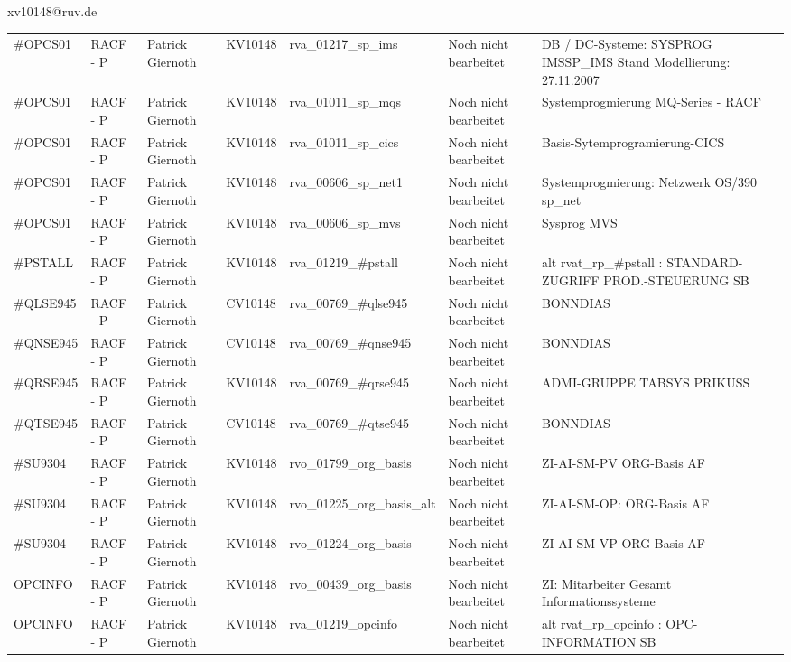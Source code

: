 \documentclass[a4paper,landscape,12pt]{letter}
\begin{document}
\begin{letter}{xv10148@ruv.de\hfill \break}
\begin{tiny}
\begin{longtable}{|p{35mm}|p{15mm}|p{25mm}|p{10mm}|p{40mm}|p{50mm}|p{50mm}|}
\#OPCS01 & RACF - P & Patrick Giernoth & KV10148 & rva\_01217\_sp\_ims & Noch nicht bearbeitet & DB / DC-Systeme:  SYSPROG IMSSP\_IMS Stand Modellierung: 27.11.2007 \\
\#OPCS01 & RACF - P & Patrick Giernoth & KV10148 & rva\_01011\_sp\_mqs & Noch nicht bearbeitet & Systemprogmierung MQ-Series - RACF \\
\#OPCS01 & RACF - P & Patrick Giernoth & KV10148 & rva\_01011\_sp\_cics & Noch nicht bearbeitet & Basis-Sytemprogramierung-CICS \\
\#OPCS01 & RACF - P & Patrick Giernoth & KV10148 & rva\_00606\_sp\_net1 & Noch nicht bearbeitet & Systemprogmierung: Netzwerk OS/390 sp\_net \\
\#OPCS01 & RACF - P & Patrick Giernoth & KV10148 & rva\_00606\_sp\_mvs & Noch nicht bearbeitet & Sysprog MVS \\
\#PSTALL & RACF - P & Patrick Giernoth & KV10148 & rva\_01219\_\#pstall & Noch nicht bearbeitet & alt rvat\_rp\_\#pstall          : STANDARD-ZUGRIFF PROD.-STEUERUNG SB \\
\#QLSE945 & RACF - P & Patrick Giernoth & CV10148 & rva\_00769\_\#qlse945 & Noch nicht bearbeitet & BONNDIAS \\
\#QNSE945 & RACF - P & Patrick Giernoth & CV10148 & rva\_00769\_\#qnse945 & Noch nicht bearbeitet & BONNDIAS \\
\#QRSE945 & RACF - P & Patrick Giernoth & KV10148 & rva\_00769\_\#qrse945 & Noch nicht bearbeitet & ADMI-GRUPPE TABSYS PRIKUSS \\
\#QTSE945 & RACF - P & Patrick Giernoth & CV10148 & rva\_00769\_\#qtse945 & Noch nicht bearbeitet & BONNDIAS \\
\#SU9304 & RACF - P & Patrick Giernoth & KV10148 & rvo\_01799\_org\_basis & Noch nicht bearbeitet & ZI-AI-SM-PV ORG-Basis AF \\
\#SU9304 & RACF - P & Patrick Giernoth & KV10148 & rvo\_01225\_org\_basis\_alt & Noch nicht bearbeitet & ZI-AI-SM-OP: ORG-Basis AF \\
\#SU9304 & RACF - P & Patrick Giernoth & KV10148 & rvo\_01224\_org\_basis & Noch nicht bearbeitet & ZI-AI-SM-VP ORG-Basis AF \\
OPCINFO & RACF - P & Patrick Giernoth & KV10148 & rvo\_00439\_org\_basis & Noch nicht bearbeitet & ZI: Mitarbeiter Gesamt Informationssysteme \\
OPCINFO & RACF - P & Patrick Giernoth & KV10148 & rva\_01219\_opcinfo & Noch nicht bearbeitet & alt rvat\_rp\_opcinfo          : OPC- INFORMATION                         SB \\

\end{longtable}
\end{tiny}
\end{letter}
\end{document}
